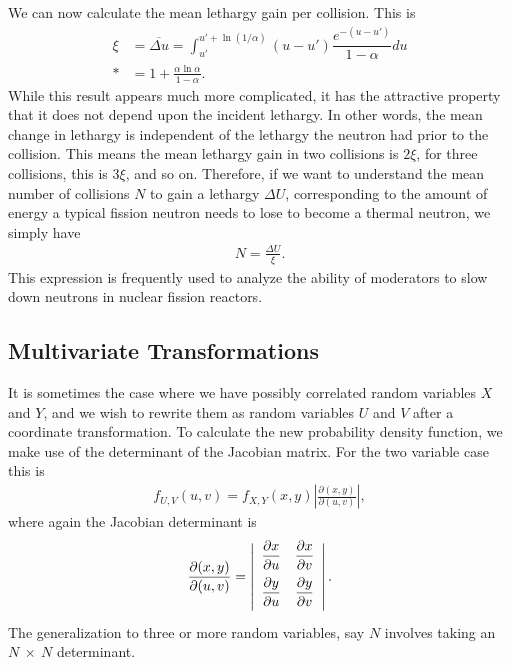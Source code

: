 We can now calculate the mean lethargy gain per collision. This is
\begin{align}
  \xi &= \overline{\Delta u} = \int_{u'}^{u' + \ln(1/\alpha)} ( u - u' ) \dfrac{e^{-(u - u')}}{1-\alpha} du \nonumber \\*
  &= 1 + \frac{ \alpha \ln \alpha }{ 1 - \alpha } .
\end{align}
While this result appears much more complicated, it has the attractive property that it does not depend upon the incident lethargy. In other words, the mean change in lethargy is independent of the lethargy the neutron had prior to the collision. This means the mean lethargy gain in two collisions is $2\xi$, for three collisions, this is $3\xi$, and so on. Therefore, if we want to understand the mean number of collisions $N$ to gain a lethargy $\Delta U$, corresponding to the amount of energy a typical fission neutron needs to lose to become a thermal neutron, we simply have
\begin{align}
  N = \frac{ \Delta U }{ \xi } .
\end{align}
This expression is frequently used to analyze the ability of moderators to slow down neutrons in nuclear fission reactors.

\subsection{Multivariate Transformations}

It is sometimes the case where we have possibly correlated random variables $X$ and $Y$, and we wish to rewrite them as random variables $U$ and $V$ after a coordinate transformation. To calculate the new probability density function, we make use of the determinant of the Jacobian matrix. For the two variable case this is
\begin{align}
  f_{U,V}(u,v) = f_{X,Y}(x,y) \left| \frac{ \partial( x, y ) }{ \partial( u, v ) } \right| ,
\end{align}
where again the Jacobian determinant is
\begin{align}
  \frac{ \partial( x, y ) }{ \partial( u, v ) } 
  = \left| \begin{array}{c c}
  \dfrac{ \partial x }{ \partial u } & \dfrac{ \partial x }{ \partial v } \vspace{0.2cm} \\
  \dfrac{ \partial y }{ \partial u } & \dfrac{ \partial y }{ \partial v }\vspace{0.2cm} \\ \end{array} \right| .
\end{align}
The generalization to three or more random variables, say $N$ involves taking an $N~\times~N$ determinant.

